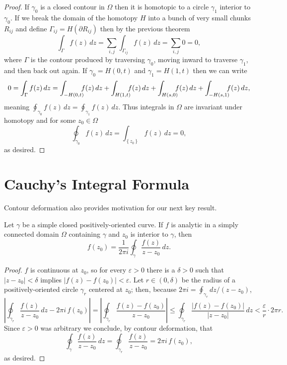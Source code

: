 \documentclass[../m136main.tex]{subfiles}
\begin{document}
\begin{proof}
    If $\gamma_0$ is a closed contour in $\Omega$ then it is homotopic to a circle $\gamma_1$ interior to $\gamma_0$.
    If we break the domain of the homotopy $H$ into a bunch of very small chunks $R_{ij}$ and define $\Gamma_{ij} = H(\partial R_{ij})$ then by the previous theorem
    \[ \int_{\Gamma} f(z) \,dz = \sum_{i,j}^{} \int_{\Gamma_{ij}} f(z) \,dz = \sum_{i,j}^{} 0 = 0, \]
    where $\Gamma$ is the contour produced by traversing $\gamma_0$, moving inward to traverse $\gamma_1$, and then back out again.
    If $\gamma_0 = H(0,t)$ and $\gamma_1 = H(1,t)$ then we can write
    \[ 0 = \int_\Gamma f(z) \,dz = \int_{-H(0,t)} \hspace{-6pt} f(z) \,dz + \int_{H(1,t)} \hspace{-6pt} f(z) \,dz + \int_{H(s,0)} \hspace{-6pt} f(z) \,dz + \int_{-H(s,1)} \hspace{-6pt} f(z) \,dz, \]
    meaning $\oint_{\gamma_0} f(z) \,dz = \oint_{\gamma_1} f(z) \,dz$.
    Thus integrals in $\Omega$ are invariant under homotopy and for some $z_0 \in \Omega$
    \[ \oint_{\gamma_0} f(z) \,dz = \int_{\left\{ z_0 \right\}} f(z) \,dz = 0, \]
    as desired.
\end{proof}

\section{Cauchy's Integral Formula}
Contour deformation also provides motivation for our next key result.

\begin{theorem}
    Let $\gamma$ be a simple closed positively-oriented curve.
    If $f$ is analytic in a simply connected domain $\Omega$ containing $\gamma$ and $z_0$ is interior to $\gamma$, then
    \[ f(z_0) = \frac{1}{2\pi i} \oint_\gamma \frac{f(z)}{z - z_0} \,dz. \]
\end{theorem}

\begin{proof}
    $f$ is continuous at $z_0$, so for every $\varepsilon > 0$ there is a $\delta > 0$ such that $|z - z_0| < \delta$ implies $|f(z) - f(z_0)| < \varepsilon$.
    Let $r \in (0, \delta)$ be the radius of a positively-oriented circle $\gamma_r$ centered at $z_0$; then, because $2\pi i = \oint_{\gamma_r} dz / (z - z_0)$,
    \[ \left| \oint_{\gamma_r} \frac{f(z)}{z - z_0} \,dz - 2\pi i \,f(z_0) \right| = \left| \oint_{\gamma_r} \frac{f(z) - f(z_0)}{z - z_0} \right| \leq \oint_{\gamma_r} \frac{|f(z) - f(z_0)|}{|z - z_0|} \,dz < \frac{\varepsilon}{r} \cdot 2\pi r. \]
    Since $\varepsilon > 0$ was arbitrary we conclude, by contour deformation, that
    \[ \oint_\gamma \frac{f(z)}{z - z_0} \,dz = \oint_{\gamma_r} \frac{f(z)}{z - z_0} = 2\pi i \,f(z_0), \]
    as desired.
\end{proof}
\end{document}
